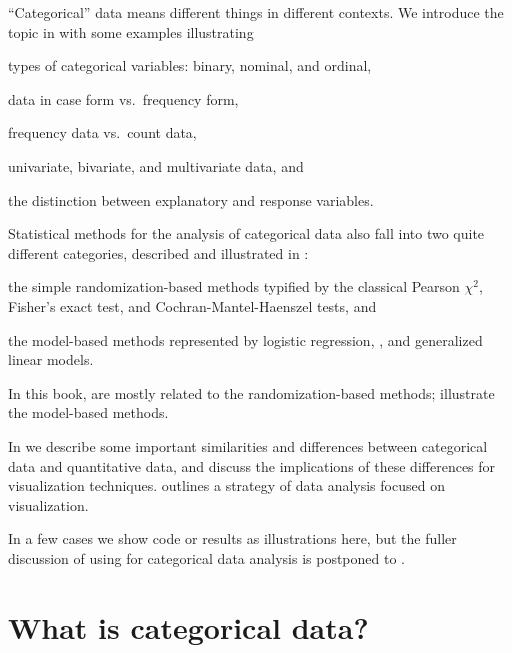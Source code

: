 \documentclass[11pt]{book}\usepackage[]{graphicx}\usepackage[]{color}
\begin{document}
``Categorical'' data means different things in different
contexts.  We introduce the topic in 
with some examples illustrating
\begin{seriate}
\item types of categorical variables: binary, nominal, and ordinal,
\item data in case form vs.\ frequency form,
\item frequency data vs.\ count data,
\item univariate, bivariate, and multivariate data, and
\item the distinction between explanatory and response variables.
\end{seriate}

Statistical methods for the analysis of categorical data also fall into two
quite different categories, described and illustrated in : 
\begin{seriate}
\item the simple randomization-based
methods typified by
the classical Pearson $\chi^2$, Fisher's exact test, and Cochran-Mantel-Haenszel
tests, and 
\item the model-based methods represented by
logistic regression, \loglin, and generalized linear models.
\end{seriate}
In this book, 
are mostly related to the randomization-based methods; 
illustrate the model-based methods.

In  we describe some important similarities
and 
differences between categorical data and
quantitative data, and discuss the implications of these differences for
visualization techniques.
 outlines a strategy of data analysis
focused on visualization.

In a few cases we show \R code or results as illustrations here,
but the fuller discussion of using \R for categorical data
analysis is postponed to .


\section{What is categorical data?}\label{sec:whatis}
\end{document}
